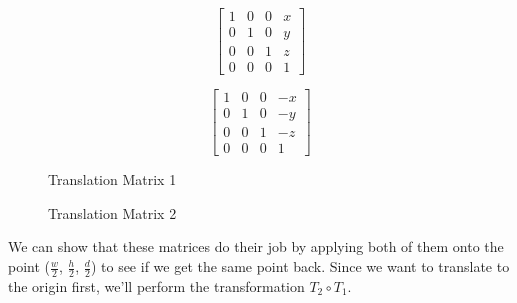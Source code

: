 \documentclass[14pt]{article}
\begin{document}
\begin{figure}[H]
	\begin{center}
		\begin{minipage}[b]{0.45\textwidth}
			\centering	
			$$
			\begin{bmatrix}
			1 & 0 & 0 & x \\
			0 & 1 & 0 & y \\ 
			0 & 0 & 1 & z \\
			0 & 0 & 0 & 1
			\end{bmatrix}			
			$$
		\end{minipage}
		\hfill
		\begin{minipage}[b]{0.45\textwidth}
			\centering
			$$
			\begin{bmatrix}
			1 & 0 & 0 & -x \\
			0 & 1 & 0 & -y \\ 
			0 & 0 & 1 & -z \\
			0 & 0 & 0 & 1
			\end{bmatrix}			
			$$
		\end{minipage}
	\end{center}
	\begin{center}
		\begin{minipage}[t]{0.45\textwidth}
			\caption*{Translation Matrix 1}
		\end{minipage}
		\hfill
		\begin{minipage}[t]{0.45\textwidth}
			\caption*{Translation Matrix 2}
		\end{minipage}
	\end{center}
\end{figure}

\vspace*{-7mm}

We can show that these matrices do their job by applying both of them onto the point ($\frac{w}{2}$, $\frac{h}{2}$, $\frac{d}{2}$) to see if we get the same point back. Since we want to translate to the origin first, we'll perform the transformation $T_2 \circ T_1$.

\vspace*{1em}
\end{document}
